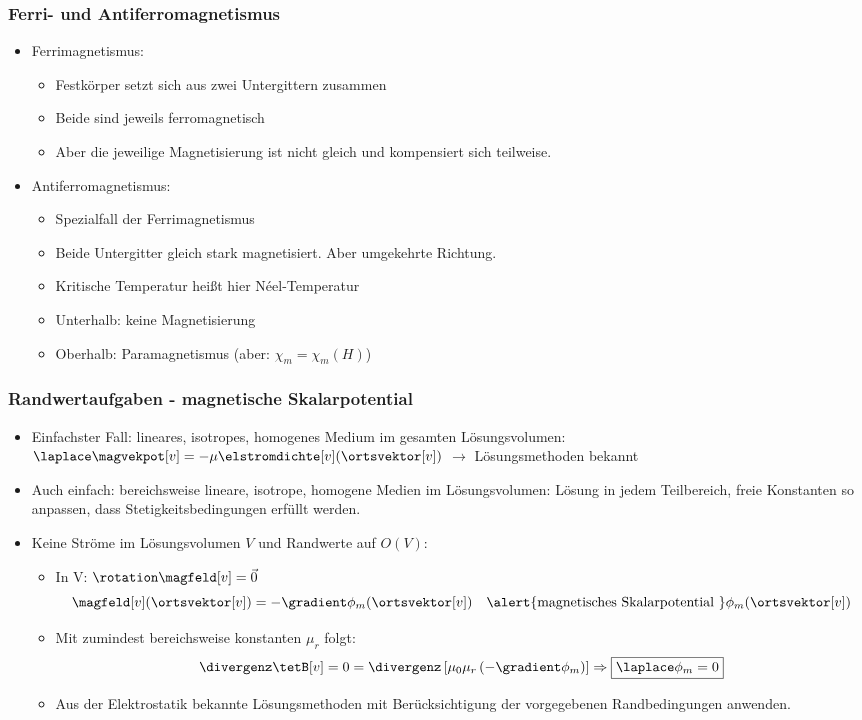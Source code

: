 \begin{frame}
  \frametitle{Ferri- und Antiferromagnetismus}
  \begin{itemize}[<+->]
  \item Ferrimagnetismus:
  \begin{itemize}[<+->]
  \item Festkörper setzt sich aus zwei Untergittern zusammen
  \item Beide sind jeweils ferromagnetisch
    \item Aber die jeweilige Magnetisierung ist nicht gleich und kompensiert sich teilweise.
  \end{itemize}
  \item Antiferromagnetismus:
  \begin{itemize}[<+->]
  \item Spezialfall der Ferrimagnetismus
  \item Beide Untergitter gleich stark magnetisiert. Aber umgekehrte Richtung.
  \item Kritische Temperatur heißt hier \alert{N{\'e}el-Temperatur}
  \item Unterhalb: keine Magnetisierung
    \item Oberhalb: Paramagnetismus (aber: $\chi_m=\chi_m(H)$) 
  \end{itemize}
\end{itemize}
\end{frame}



\begin{frame}
  \frametitle{Randwertaufgaben - magnetische Skalarpotential}
  \begin{itemize}[<+->]
  \item Einfachster Fall: lineares, isotropes, homogenes Medium im \alert{gesamten} Lösungsvolumen: $\laplace \magvekpot[v]= -\mu \elstromdichte[v](\ortsvektor[v])$ $\to$ Lösungsmethoden bekannt
  \item Auch einfach: \alert{bereichsweise} lineare, isotrope, homogene Medien im Lösungsvolumen: Lösung in jedem Teilbereich, freie Konstanten so anpassen, dass Stetigkeitsbedingungen erfüllt werden.
  \item Keine Ströme im Lösungsvolumen $V$ und Randwerte auf $O(V)$:
      \begin{itemize}[<+->]
      \item In V: $\rotation\magfeld[v] = \vec{0}$
        $$
        \magfeld[v](\ortsvektor[v]) = -\gradient \phi_m (\ortsvektor[v]) \quad \text{\alert{magnetisches Skalarpotential }} \phi_m (\ortsvektor[v]) 
        $$
      \item Mit zumindest bereichsweise konstanten $\mu_r$ folgt:
        $$
        \divergenz \tetB[v] = 0 = \divergenz \left[\mu_0\mu_r \left(-\gradient \phi_m \right)\right] \Rightarrow \boxed{\laplace \phi_m = 0}
        $$
        \item Aus der Elektrostatik bekannte Lösungsmethoden mit Berücksichtigung der vorgegebenen Randbedingungen anwenden.
\end{itemize}
\end{itemize}
\end{frame}

